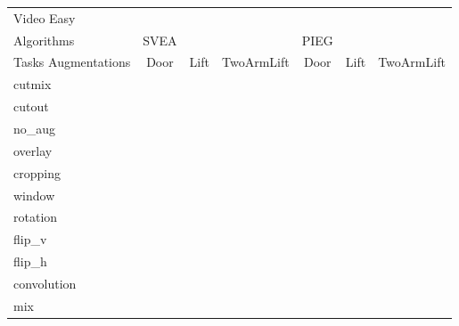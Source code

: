 \begin{tabular}{lcccccc}
Video Easy & & & & & & \\
Algorithms & SVEA & & & PIEG & & \\
Tasks Augmentations & Door & Lift & TwoArmLift & Door & Lift & TwoArmLift \\
cutmix          &  &  &  &  &  &  \\
cutout          &  &  &  &  &  &  \\
no\_aug         &  &  &  &  &  &  \\
overlay         &  &  &  &  &  &  \\
cropping        &  &  &  &  &  &  \\
window          &  &  &  &  &  &  \\
rotation        &  &  &  &  &  &  \\
flip\_v         &  &  &  &  &  &  \\
flip\_h         &  &  &  &  &  &  \\
convolution     &  &  &  &  &  &  \\
mix             &  &  &  &  &  &  \\
\end{tabular}